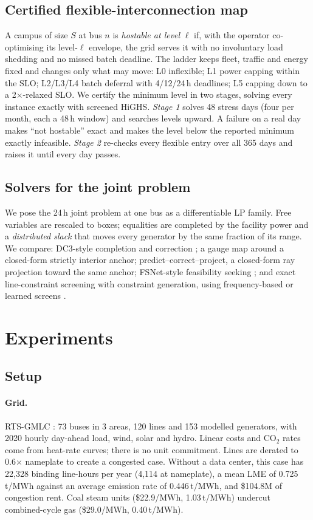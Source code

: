 \documentclass{article} %
\begin{document}
\subsection{Certified flexible-interconnection map}
\label{sec:map}
A campus of size $S$ at bus $n$ is \emph{hostable at level} $\ell$ if, with the operator co-optimising its level-$\ell$ envelope, the grid serves it with no involuntary load shedding and no missed batch deadline. The ladder keeps fleet, traffic and energy fixed and changes only what may move: L0 inflexible; L1 power capping within the SLO; L2/L3/L4 batch deferral with 4/12/24\,h deadlines; L5 capping down to a 2$\times$-relaxed SLO. We certify the minimum level in two stages, solving every instance exactly with screened HiGHS. \emph{Stage 1} solves 48 stress days (four per month, each a 48\,h window) and searches levels upward. A failure on a real day makes ``not hostable'' exact and makes the level below the reported minimum exactly infeasible. \emph{Stage 2} re-checks every flexible entry over all 365 days and raises it until every day passes.

\subsection{Solvers for the joint problem}
\label{sec:solvers}
We pose the 24\,h joint problem at one bus as a differentiable LP family. Free variables are rescaled to boxes; equalities are completed by the facility power and a \emph{distributed slack} that moves every generator by the same fraction of its range. We compare: DC3-style completion and correction \citep{donti2021dc3}; a gauge map \citep{tabas2022safe,li2023loop} around a closed-form strictly interior anchor; predict--correct--project, a closed-form ray projection toward the same anchor; FSNet-style feasibility seeking \citep{nguyen2025fsnet}; and exact line-constraint screening with constraint generation, using frequency-based or learned screens \citep{pineda2020screening}.

\section{Experiments}
\label{sec:experiments}
\subsection{Setup}
\paragraph{Grid.} RTS-GMLC \citep{barrows2020rts}: 73 buses in 3 areas, 120 lines and 153 modelled generators, with 2020 hourly day-ahead load, wind, solar and hydro. Linear costs and CO$_2$ rates come from heat-rate curves; there is no unit commitment. Lines are derated to 0.6$\times$ nameplate to create a congested case. Without a data center, this case has 22{,}328 binding line-hours per year (4{,}114 at nameplate), a mean LME of 0.725\,t/MWh against an average emission rate of 0.446\,t/MWh, and \$104.8M of congestion rent. Coal steam units (\$22.9/MWh, 1.03\,t/MWh) undercut combined-cycle gas (\$29.0/MWh, 0.40\,t/MWh).
\end{document}
